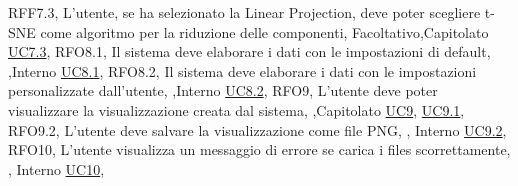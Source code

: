 {    {RFF7.3, L'utente{,} se ha selezionato la Linear Projection{,} deve poter scegliere t-SNE come algoritmo per la riduzione delle componenti, Facoltativo,Capitolato \noexpand\hyperref[uc7.3]{UC7.3}},
    {RFO8.1, Il sistema deve elaborare i dati con le impostazioni di default, \obb,Interno \noexpand\hyperref[uc8.1]{UC8.1}},
    {RFO8.2, Il sistema deve elaborare i dati con le impostazioni personalizzate dall'utente, \obb,Interno \noexpand\hyperref[uc8.2]{UC8.2}},
    {RFO9, L'utente deve poter visualizzare la visualizzazione creata dal sistema, \obb,Capitolato \noexpand\hyperref[uc9]{UC9}{,} \noexpand\hyperref[uc9.1]{UC9.1}},
    {RFO9.2, L'utente deve salvare la visualizzazione come file PNG, \obb, Interno \noexpand\hyperref[uc9.2]{UC9.2}},
    {RFO10, L'utente visualizza un messaggio di errore se carica i files scorrettamente, \obb, Interno \noexpand\hyperref[uc10]{UC10}},
}










